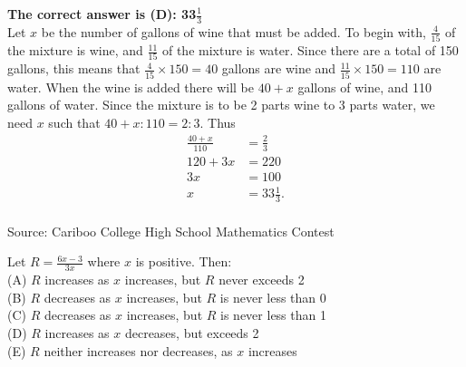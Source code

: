 \documentclass{article}
\begin{document}

\textbf{The correct answer is (D): 33$\frac{1}{3}$}\\
Let $x$ be the number of gallons of wine that must be added. To begin with, $\frac{4}{15}$ of the mixture is wine, and $\frac{11}{15}$ of the mixture is water. Since there are a total of 150 gallons, this means that $\frac{4}{15}\times150=40$ gallons are wine and $\frac{11}{15}\times150=110$ are water. When the wine is added there will be $40+x$ gallons of wine, and 110 gallons of water. Since the mixture is to be 2 parts wine to 3 parts water, we need $x$ such that $40+x:110=2:3$. Thus
\begin{align*}
\frac{40+x}{110}&=\frac{2}{3}\\
120+3x&=220\\
3x&=100\\
x&=33\frac{1}{3}.
\end{align*}
\\[5 ex]

\scriptsize
Source: Cariboo College High School Mathematics Contest

\normalsize
Let $R=\frac{6x-3}{3x}$ where $x$ is positive. Then:\\
(A) $R$ increases as $x$ increases, but $R$ never exceeds 2\\
(B) $R$ decreases as $x$ increases, but $R$ is never less than 0\\
(C) $R$ decreases as $x$ increases, but $R$ is never less than 1\\
(D) $R$ increases as $x$ decreases, but exceeds 2\\
(E) $R$ neither increases nor decreases, as $x$ increases\\
\end{document}
